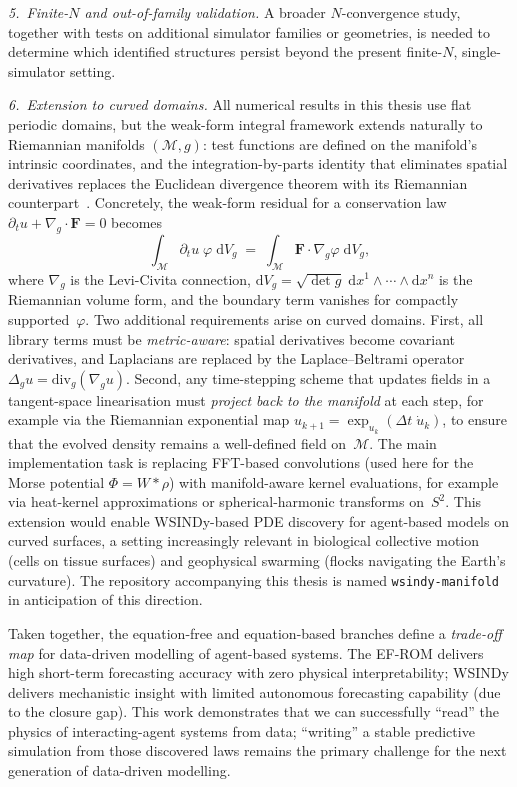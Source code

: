 \emph{5.~Finite-$N$ and out-of-family validation.}
A broader $N$-convergence study, together with tests on additional simulator
families or geometries, is needed to determine which identified structures
persist beyond the present finite-$N$, single-simulator setting.

\emph{6.~Extension to curved domains.}
All numerical results in this thesis use flat periodic domains, but the
weak-form integral framework extends naturally to Riemannian manifolds
$(\mathcal{M},g)$: test functions are defined on the manifold's intrinsic
coordinates, and the integration-by-parts identity that eliminates spatial
derivatives replaces the Euclidean divergence theorem with its Riemannian
counterpart~\cite{lee2018riemannian}.  Concretely, the weak-form residual
for a conservation law $\partial_t u + \nabla_g\!\cdot\!\mathbf{F}=0$
becomes
\begin{equation}
  \int_{\mathcal{M}} \partial_t u\;\varphi\;\mathrm{d}V_g
  \;=\;
  \int_{\mathcal{M}} \mathbf{F}\cdot\nabla_g\varphi\;\mathrm{d}V_g,
  \label{eq:weak_form_riemannian}
\end{equation}
where $\nabla_g$ is the Levi-Civita connection, $\mathrm{d}V_g =
\sqrt{\det g}\;\mathrm{d}x^1\!\wedge\!\cdots\!\wedge\mathrm{d}x^n$ is
the Riemannian volume form, and the boundary term vanishes for compactly
supported~$\varphi$.  Two additional requirements arise on curved
domains.  First, all library terms must be \emph{metric-aware}: spatial
derivatives become covariant derivatives, and Laplacians are replaced by
the Laplace--Beltrami operator $\Delta_g u = \mathrm{div}_g(\nabla_g u)$.
Second, any time-stepping scheme that updates fields in a tangent-space
linearisation must \emph{project back to the manifold} at each step,
for example via the Riemannian exponential map
$u_{k+1} = \exp_{u_k}(\Delta t\;\dot{u}_k)$, to ensure that the
evolved density remains a well-defined field on~$\mathcal{M}$.
The main implementation task is
replacing FFT-based convolutions (used here for the Morse potential
$\Phi=W*\rho$) with manifold-aware kernel evaluations, for example via
heat-kernel approximations or spherical-harmonic transforms on~$S^2$.
This extension would enable WSINDy-based PDE discovery for agent-based
models on curved surfaces, a setting increasingly relevant in
biological collective motion (cells on tissue surfaces) and
geophysical swarming (flocks navigating the Earth's curvature).
The repository accompanying this thesis is named
\texttt{wsindy-manifold} in anticipation of this direction.

\noindent
Taken together, the equation-free and equation-based branches define a
\emph{trade-off map} for data-driven modelling of agent-based systems.
The EF-ROM delivers high short-term forecasting accuracy with zero
physical interpretability; WSINDy delivers mechanistic insight with
limited autonomous forecasting capability (due to the closure gap).
This work demonstrates that we can successfully ``read'' the physics of
interacting-agent systems from data; ``writing'' a stable predictive
simulation from those discovered laws remains the primary challenge for
the next generation of data-driven modelling.
